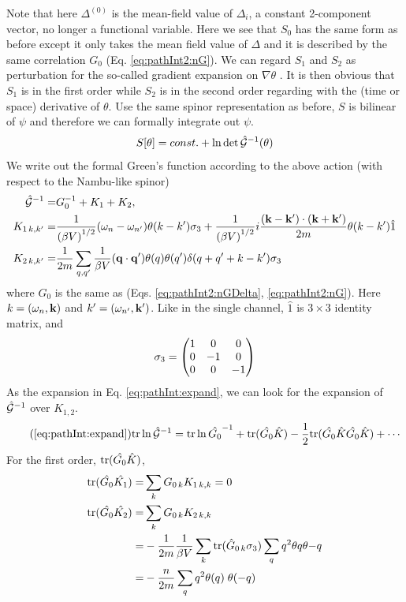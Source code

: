Note that here $\Delta^{(0)}$ is the mean-field value of $\Delta_{i}$, a constant 2-component vector, no longer a functional variable.  Here we see that $S_{0}$ has the same form as before except it only takes the mean field value of $\Delta$ and it is described by the same correlation $G_{0}$ (Eq. \ref{eq:pathInt2:nG}).  We can regard $S_{1}$ and $S_{2}$ as perturbation for the so-called gradient expansion on $\nabla\theta$ \cite{Altland}.  It is then obvious that $S_{1}$ is in the first order while $S_{2}$ is in the second order regarding with the (time or space) derivative of $\theta$.  Use the same spinor representation as before, $S$ is bilinear of $\psi$ and therefore we can formally integrate out $\psi$. 
\begin{equation}
S[\theta]=const.+\ln\det\hat{\mathcal{G}}^{-1}(\theta)
\end{equation}
 We write out the formal Green's function according to the above action (with respect to the Nambu-like spinor)
\begin{subequations}
\begin{align}
\hat{\mathcal{G}}^{-1}=&G_{0}^{-1}+K_{1}+K_{2},\\
K_{1\, k,k'}=
	&\frac{1}{({\beta{}V)}^{1/2}}(\omega_n-\omega_{n'})\theta(k-k')\sigma_3+
		\frac{1}{{(\beta{}V)}^{1/2}}i\frac{(\mathbf{k}-\mathbf{k}')\cdot(\mathbf{k}+\mathbf{k}')}{2m}\theta(k-k')\hat{1}\\
K_{2\, k,k'}=
	&\frac{1}{2m}\sum_{q,q'}\frac{1}{{\beta{}V}}(\mathbf{q}\cdot\mathbf{q}')\theta(q)\theta(q')\delta(q+q'+k-k')\sigma_3
\end{align}
\end{subequations}
where $G_{0}$ is the same as (Eqs. \ref{eq:pathInt2:nGDelta}, \ref{eq:pathInt2:nG}).  Here $k=(\omega_n,\mathbf{k})$ and $k'=(\omega_{n'},\mathbf{k}')$.  Like in the single channel, $\hat{1}$ is $3\times3$ identity matrix, and 
\begin{equation}
\sigma_3=\begin{pmatrix}1&0&0\\0&-1&0\\0&0&-1\end{pmatrix}
\end{equation}
As the expansion in Eq. \ref{eq:pathInt:expand}, we can look for the expansion of $\hat{\mathcal{G}}^{-1}$ over $K_{1,2}$.  
\begin{equation}\tag{\ref{eq:pathInt:expand}}
\tr\ln \nG=\tr\ln\hat{G_{0}}^{-1}+\tr(\hat{G_{0}}\hat{K})-\nth{2}\tr(\hat{G_{0}}\hat{K}\hat{G_{0}}\hat{K})+\cdots
\end{equation}
For the first order, $\text{tr}(\hat{G_{0}}\hat{K})$, 
\begin{align}
\text{tr}(\hat{G_{0}}\hat{K_1})=&\sum_{k}{G_{0\,k}K_{1\,k,k}}=0\\
\text{tr}(\hat{G_{0}}\hat{K_2})=&\sum_{k}{G_{0\,k}K_{2\,k,k}}\nonumber\\
	=&-\frac{1}{2m}\frac{1}{{\beta{}V}}\sum_{k}\text{tr}(\hat{G}_{0\,k}\sigma_3)\sum_{q}q^2\theta{q}\theta{-q}\nonumber\\
	=&-\frac{n}{2m}\sum_{q}q^2\theta{(q)}\;\theta{(-q)}
\end{align}
